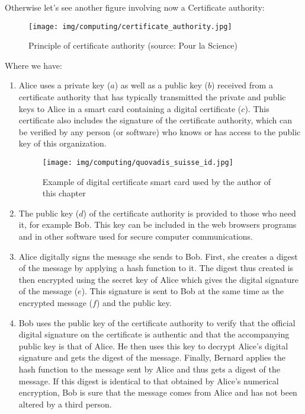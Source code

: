 	Otherwise let's see another figure involving now a Certificate authority:
	\begin{figure}[H]
		\centering
		\texttt{[image: img/computing/certificate\_authority.jpg]}
		\caption[Principle of certificate authority]{Principle of certificate authority (source: Pour la Science)}
	\end{figure}
	Where we have:
	\begin{enumerate}
		\item Alice uses a private key ($a$) as well as a public key ($b$) received from a certificate authority that has typically transmitted the private and public keys to Alice in a smart card containing a digital certificate ($c$). This certificate also includes the signature of the certificate authority, which can be verified by any person (or software) who knows or has access to the public key of this organization.
		\begin{figure}[H]
		\centering
		\texttt{[image: img/computing/quovadis\_suisse\_id.jpg]}
		\caption[]{Example of digital certificate smart card used by the author of this chapter}
	\end{figure}
		
		\item The public key ($d$) of the certificate authority is provided to those who need it, for example Bob. This key can be included in the web browsers programs and in other software used for secure computer communications.
		
		\item Alice digitally signs the message she sends to Bob. First, she creates a digest of the message by applying a hash function to it. The digest thus created is then encrypted using the secret key of Alice which gives the digital signature of the message ($e$). This signature is sent to Bob at the same time as the encrypted message ($f$) and the public key.
		
		\item Bob uses the public key of the certificate authority to verify that the official digital signature on the certificate is authentic and that the accompanying public key is that of Alice. He then uses this key to decrypt Alice's digital signature and gets the digest of the message. Finally, Bernard applies the hash function to the message sent by Alice and thus gets a digest of the message. If this digest is identical to that obtained by Alice's numerical encryption, Bob is sure that the message comes from Alice and has not been altered by a third person.
	\end{enumerate}
	
